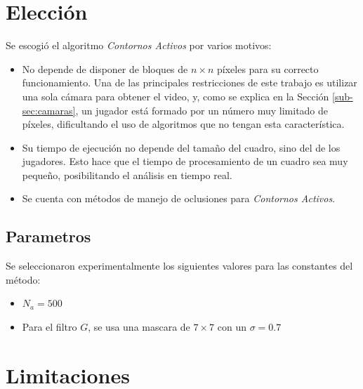 \section{Elección}
\label{sec:eleccion}

Se escogió el algoritmo \emph{Contornos Activos} por varios motivos:
\begin{itemize}
    \item No depende de disponer de bloques de $n \times n$ píxeles para su
        correcto funcionamiento. Una de las principales restricciones de este
        trabajo es utilizar una sola cámara para obtener el video, y, como se
        explica en la Sección \ref{sub-sec:camaras}, un jugador está formado
        por un número muy limitado de píxeles, dificultando el uso de
        algoritmos que no tengan esta característica.

    \item Su tiempo de ejecución no depende del tamaño del cuadro, sino del
        de los jugadores. Esto hace que el tiempo de procesamiento de un cuadro
        sea muy pequeño, posibilitando el análisis en tiempo real.

    \item Se cuenta con métodos de manejo de oclusiones para
        \emph{Contornos Activos}\cite{paper-juliana}.

\end{itemize}

\subsection{Parametros}

Se seleccionaron experimentalmente los siguientes valores para las constantes
del método:

\begin{itemize}
\item $N_a = 500$ 
\item Para el filtro $G$, se usa una mascara de $7 \times 7$ con un $\sigma = 0.7$ 
\end{itemize}

\section{Limitaciones}
\label{sec:ac-problemas}

